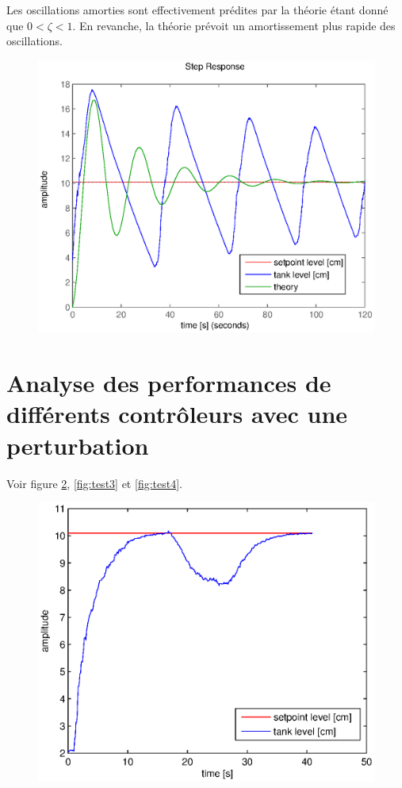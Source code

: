 \documentclass[frenchb, paper=a4, fontsize=11pt]{scrartcl}
\numberwithin{equation}{section}					%
\numberwithin{figure}{section}					%
\numberwithin{table}{section}						%
\begin{document}
Les oscillations amorties sont effectivement prédites par la théorie
étant donné que $0 < \zeta < 1$. En revanche, la théorie prévoit un
amortissement plus rapide des oscillations.

\begin{figure}
  \centering
  \includegraphics[width=1.0\linewidth]{img/cl-2_5-2-im.eps}
  \label{fig:test1}
\end{figure}

\section{Analyse des performances de différents contrôleurs avec une perturbation}
Voir figure \ref{fig:test2}, \ref{fig:test3} et \ref{fig:test4}.

\begin{figure}[!ht]
  \centering
  \includegraphics[width=.99\linewidth]{img/cl-10-0.eps}
  \label{fig:test2}
\end{figure}
\end{document}

